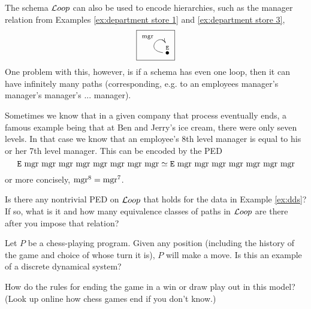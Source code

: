 \documentclass[CT4S-EN-RU]{subfiles}
\begin{document}
\begin{applicationRUS}
\end{applicationRUS}

\begin{exampleENG}\label{ex:finite hierarchy}
The schema ${\mathcal{L} oop}$ can also be used to encode hierarchies, such as the manager relation from Examples \ref{ex:department store 1} and \ref{ex:department store 3}, 
$$\fbox{\xymatrix{\LTO{E}\ar@(l,u)[]^{\tn{mgr}}}}$$
One problem with this, however, is if a schema has even one loop, then it can have infinitely many paths (corresponding, e.g. to an employees manager's manager's manager's ... manager). 

Sometimes we know that in a given company that process eventually ends, a famous example being that at Ben and Jerry's ice cream, there were only seven levels. In that case we know that an employee's 8th level manager is equal to his or her 7th level manager. This can be encoded by the PED $${\tt E} \textnormal{ mgr}\textnormal{ mgr}\textnormal{ mgr}\textnormal{ mgr}\textnormal{ mgr}\textnormal{ mgr}\textnormal{ mgr}\textnormal{ mgr}\simeq{\tt E}\textnormal{ mgr}\textnormal{ mgr}\textnormal{ mgr}\textnormal{ mgr}\textnormal{ mgr}\textnormal{ mgr}\textnormal{ mgr}$$ or more concisely, $\textnormal{mgr}^8=\textnormal{mgr}^7$.
\end{exampleENG}

\begin{exampleRUS}\label{ex:finite hierarchy}
\end{exampleRUS}

\begin{exerciseENG}
Is there any nontrivial PED on ${\mathcal{L} oop}$ that holds for the data in Example \ref{ex:dds}? If so, what is it and how many equivalence classes of paths in ${\mathcal{L} oop}$ are there after you impose that relation?
\end{exerciseENG}

\begin{exerciseRUS}
\end{exerciseRUS}

\begin{exerciseENG}
Let $P$ be a chess-playing program. Given any position (including the history of the game and choice of whose turn it is), $P$ will make a move. 
\sexc Is this an example of a discrete dynamical system? 
\item How do the rules for ending the game in a win or draw play out in this model? (Look up online how chess games end if you don't know.)
\endsexc
\end{exerciseENG}
\end{document}
